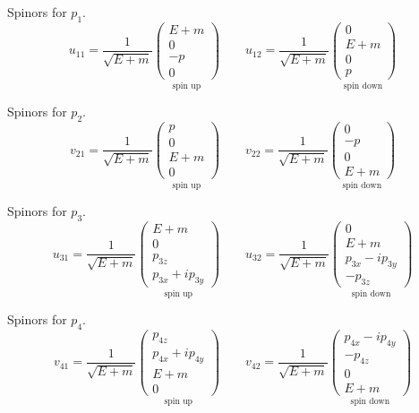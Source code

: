 Spinors for $p_1$.
\begin{equation*}
u_{11}=\frac{1}{\sqrt{E+m}}
\underset{\text{spin up}}
{\begin{pmatrix}E+m\\0\\-p\\0\end{pmatrix}}
\qquad
u_{12}=\frac{1}{\sqrt{E+m}}
\underset{\text{spin down}}
{\begin{pmatrix}0\\E+m\\0\\p\end{pmatrix}}
\end{equation*}

Spinors for $p_2$.
\begin{equation*}
v_{21}=\frac{1}{\sqrt{E+m}}
\underset{\text{spin up}}
{\begin{pmatrix}p\\0\\E+m\\0\end{pmatrix}}
\qquad
v_{22}=\frac{1}{\sqrt{E+m}}
\underset{\text{spin down}}
{\begin{pmatrix}0\\-p\\0\\E+m\end{pmatrix}}
\end{equation*}

Spinors for $p_3$.
\begin{equation*}
u_{31}=\frac{1}{\sqrt{E+m}}
\underset{\text{spin up}}
{\begin{pmatrix}E+m\\0\\p_{3z}\\p_{3x}+ip_{3y}\end{pmatrix}}
\qquad
u_{32}=\frac{1}{\sqrt{E+m}}
\underset{\text{spin down}}
{\begin{pmatrix}0\\E+m\\p_{3x}-ip_{3y}\\-p_{3z}\end{pmatrix}}
\end{equation*}

Spinors for $p_4$.
\begin{equation*}
v_{41}=\frac{1}{\sqrt{E+m}}
\underset{\text{spin up}}
{\begin{pmatrix}p_{4z}\\p_{4x}+ip_{4y}\\E+m\\0\end{pmatrix}}
\qquad
v_{42}=\frac{1}{\sqrt{E+m}}
\underset{\text{spin down}}
{\begin{pmatrix}p_{4x}-ip_{4y}\\-p_{4z}\\0\\E+m\end{pmatrix}}
\end{equation*}

